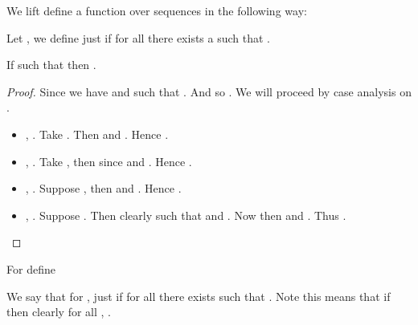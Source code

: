 We lift define a function  over sequences  in the following way:

Let , we define  just if for all  there exists a  such that .
\begin{lemma}\label{apx:lemma:mseqpar_sim_SF}
If  such that  then .
\end{lemma}
\begin{proof}
Since  we have  and  such that 
. And so . We will proceed by case analysis on .
\begin{itemize}
 	\item , . \newline 
 		  Take .
 		  Then  and . Hence .
 	\item , . \newline 
 		  Take , then since
 		   and . Hence .	 
 	\item , . \newline 
 		  Suppose , then
 		   and . Hence .	
 	\item , . \newline 
 		  Suppose . Then clearly  such that  and .
 		  Now then  and .
 		  Thus .	 	   
 \end{itemize} 

\end{proof}

For  define


We say that for  , just if for all  there exists  such that . Note this means that if  then clearly  for all , .

